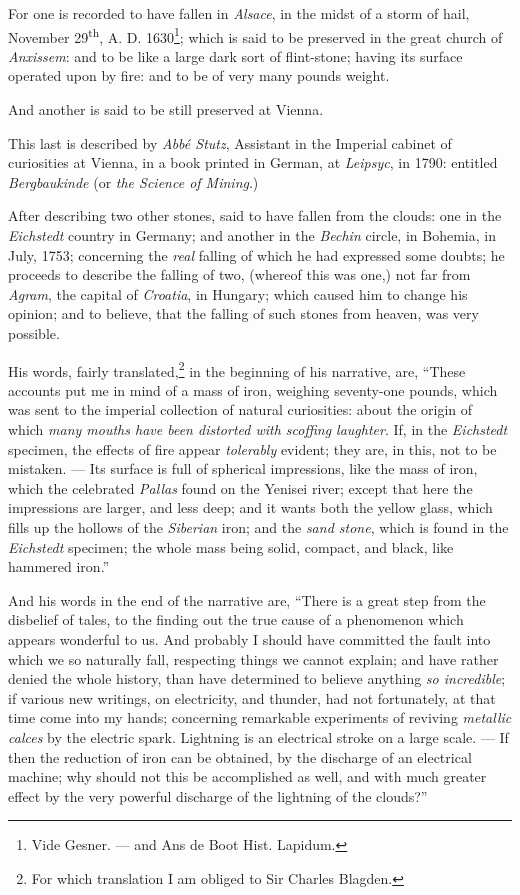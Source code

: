 \documentclass[a4paper, 12pt, oneside]{article}
\begin{document}
For one is recorded to have fallen in \emph{Alsace}, in the midst of a storm of hail, November 29\textsuperscript{th}, A. D. 1630\footnote{Vide Gesner. --- and Ans de Boot Hist. Lapidum.}; which is said to be preserved in the great church of \emph{Anxissem}: and to be like a large dark sort of flint-stone; having its surface operated upon by fire: and to be of very many pounds weight.

And another is said to be still preserved at Vienna.

This last is described by \emph{Abbé Stutz}, Assistant in the Imperial cabinet of curiosities at Vienna, in a book printed in German, at \emph{Leipsyc}, in 1790: entitled \emph{Bergbaukinde} (or \emph{the Science of Mining}.)

After describing two other stones, said to have fallen from the clouds: one in the \emph{Eichstedt} country in Germany; and another in the \emph{Bechin} circle, in Bohemia, in July, 1753; concerning the \emph{real} falling of which he had expressed some doubts; he proceeds to describe the falling of two, (whereof this was one,) not far from \emph{Agram}, the capital of \emph{Croatia}, in Hungary; which caused him to change his opinion; and to believe, that the falling of such stones from heaven, was very possible.

His words, fairly translated,\footnote{For which translation I am obliged to Sir Charles Blagden.} in the beginning of his narrative, are, ``These accounts put me in mind of a mass of iron, weighing seventy-one pounds, which was sent to the imperial collection of natural curiosities: about the origin of which \emph{many mouths have been distorted with scoffing laughter}. If, in the \emph{Eichstedt} specimen, the effects of fire appear \emph{tolerably} evident; they are, in this, not to be mistaken. --- Its surface is full of spherical impressions, like the mass of iron, which the celebrated \emph{Pallas} found on the Yenisei river; except that here the impressions are larger, and less deep; and it wants both the yellow glass, which fills up the hollows of the \emph{Siberian} iron; and the \emph{sand stone}, which is found in the \emph{Eichstedt} specimen; the whole mass being solid, compact, and black, like hammered iron.''

And his words in the end of the narrative are, ``There is a great step from the disbelief of tales, to the finding out the true cause of a phenomenon which appears wonderful to us. And probably I should have committed the fault into which we so naturally fall, respecting things we cannot explain; and have rather denied the whole history, than have determined to believe anything \emph{so incredible}; if various new writings, on electricity, and thunder, had not fortunately, at that time come into my hands; concerning remarkable experiments of reviving \emph{metallic calces} by the electric spark. Lightning is an electrical stroke on a large scale. --- If then the reduction of iron can be obtained, by the discharge of an electrical machine; why should not this be accomplished as well, and with much greater effect by the very powerful discharge of the lightning of the clouds?''
\end{document}
